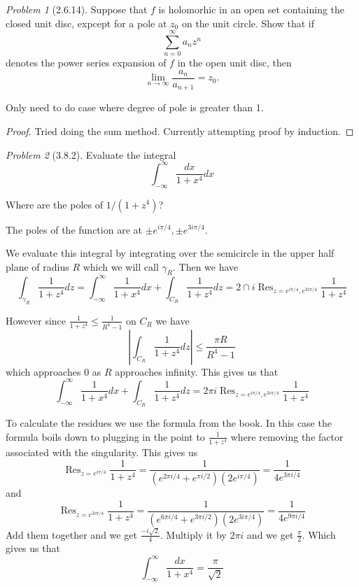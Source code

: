 \documentclass[10pt]{article}
\newcommand{\sk}{\vskip 10mm}
\DeclareMathOperator{\Res}{Res}
\theoremstyle{remark}
\newtheorem{problem}{Problem}
\theoremstyle{remark}
\begin{document}
\begin{problem}[2.6.14]
  Suppose that $f$ is holomorhic in an open set containing the closed unit disc,
  expcept for a pole at $z_0$ on the unit circle. Show that if
  \[
    \sum_{n=0}^\infty a_n z^n
  \]
  denotes the power series expansion of $f$ in the open unit disc, then
  \[
    \lim_{n\rightarrow\infty}\frac{a_n}{a_{n+1}}=z_0.
  \]
  
  Only need to do case where degree of pole is greater than 1.
\end{problem}

\begin{proof}
  Tried doing the sum method. Currently attempting proof by induction.
\end{proof}

\sk

\begin{problem}[3.8.2]
  Evaluate the integral
  \[
    \int_{-\infty}^\infty \frac{dx}{1+x^4}dx
  \]

  Where are the poles of $1/(1+z^4)$?
\end{problem}

The poles of the function are at $\pm e^{i\pi/4},\pm e^{3i\pi/4}$.

We evaluate this integral by integrating over the semicircle in the
upper half plane of radius $R$ which we will call $\gamma_R$. Then we have
\[
  \int_{\gamma_R}\frac{1}{1+z^4} dz = \int_{-\infty}^\infty \frac{1}{1+x^4}dx+\int_{C_R}\frac{1}{1+z^4}dz= 2\cap i\Res_{z=e^{i\pi/4},e^{3i\pi/4}}\frac{1}{1+z^4}
\]

However since $\frac{1}{1+z^4}\leq\frac{1}{R^4-1}$ on $C_R$ we have
\[
  \left|\int_{C_R}\frac{1}{1+z^4}dz\right|\leq\frac{\pi R}{R^4-1}
\]
which approaches $0$ as $R$ approaches infinity. This gives us that
\[
  \int_{-\infty}^\infty \frac{1}{1+x^4}dx+\int_{C_R}\frac{1}{1+z^4}dz= 2\pi i\Res_{z=e^{i\pi/4},e^{3i\pi/4}}\frac{1}{1+z^4}
\]

To calculate the residues we use the formula from the book. In this case the
formula boils down to plugging in the point to $\frac{1}{1+z^4}$ where removing the factor
associated with the singularity. This gives us
\[
  \Res_{z=e^{i\pi/4}}\frac{1}{1+z^4}=\frac{1}{(e^{2\pi i/4}+e^{\pi i/2})(2e^{i\pi/4})}=\frac{1}{4e^{3\pi i/4}}
\]
and
\[
  \Res_{z=e^{3i\pi/4}}\frac{1}{1+z^4}=\frac{1}{(e^{6\pi i/4}+e^{3\pi i/2})(2e^{3i\pi/4})}=\frac{1}{4e^{9\pi i/4}}
\]
Add them together and we get $\frac{-i\sqrt{2}}{4}$. Multiply it by $2\pi i$ and
we get $\frac{\pi}{2}$. Which gives us that
\[
  \int_{-\infty}^\infty \frac{dx}{1+x^4} = \frac{\pi}{\sqrt{2}}
\]
\end{document}
